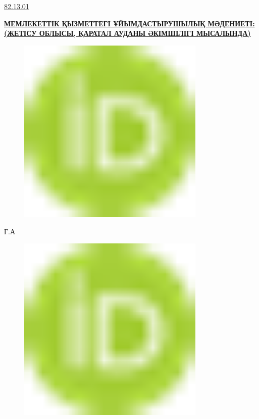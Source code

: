 \href{https://grnti.ru/?p1=82&p2=13&p3=01}{82.13.01}

\href{https://zhetysu.edu.kz/\%D1\%81\%D0\%B5\%D1\%80\%D0\%B8\%D0\%B5\%D0\%B2-\%D0\%B1\%D0\%BE\%D0\%BB\%D0\%B0\%D1\%82-\%D0\%B0\%D0\%B1\%D0\%B4\%D1\%83\%D0\%BB\%D0\%B4\%D0\%B0\%D2\%B1\%D0\%BB\%D1\%8B/}{{\bfseries МЕМЛЕКЕТТІК
ҚЫЗМЕТТЕГІ ҰЙЫМДАСТЫРУШЫЛЫҚ МӘДЕНИЕТІ: (ЖЕТІСУ ОБЛЫСЫ, ҚАРАТАЛ АУДАНЫ
ӘКІМШІЛІГІ МЫСАЛЫНДА)}}

\begin{figure}[H]
	\centering
	\includegraphics[width=0.8\textwidth]{media/ekon2/image1}
	\caption*{}
\end{figure}

Г.А
\begin{figure}[H]
	\centering
	\includegraphics[width=0.8\textwidth]{media/ekon2/image1}
	\caption*{}
\end{figure}


